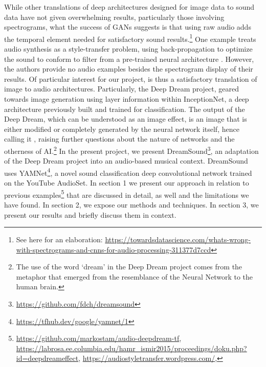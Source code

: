 \documentclass[a4paper,10pt,oneside]{article}
\begin{document}
\begin{sloppy}
While other translations of deep architectures designed for image data to sound data have not given overwhelming results, particularly those involving spectrograms, what the success of GANs suggests is that using raw audio adds the temporal element needed for satisfactory sound results.\footnote{See here for an elaboration: \url{https://towardsdatascience.com/whats-wrong-with-spectrograms-and-cnns-for-audio-processing-311377d7ccd}} One example treats audio synthesis as a style-transfer problem, using back-propagation to optimize the sound to conform to filter from a pre-trained neural architecture \cite{verma2018neural}. However, the authors provide no audio examples besides the spectrogram display of their results. Of particular interest for our project, is thus a satisfactory translation of image to audio architectures. Particularly, the Deep Dream project, geared towards image generation using layer information within InceptionNet, a deep architecture previously built and trained for classification. The output of the Deep Dream, which can be understood as an image effect, is an image that is either modified or completely generated by the neural network itself, hence calling it , raising further questions about the nature of networks and the otherness of AI.\footnote{The use of the word `dream' in the Deep Dream project comes from the metaphor that emerged from the resemblance of the Neural Network to the human brain.} In the present project, we present DreamSound\footnote{\url{https://github.com/fdch/dreamsound}}, an adaptation of the Deep Dream project into an audio-based musical context. DreamSound uses YAMNet\footnote{\url{https://tfhub.dev/google/yamnet/1}}, a novel sound classification deep convolutional network trained on the YouTube AudioSet. In section 1 we present our approach in relation to previous examples\footnote{
\url{https://github.com/markostam/audio-deepdream-tf}, 
\url{https://labrosa.ee.columbia.edu/hamr_ismir2015/proceedings/doku.php?id=deepdreameffect}, 
\url{https://audiostyletransfer.wordpress.com/}, 
} that are discussed in detail, as well and the limitations we have found. In section 2, we expose our methods and techniques. In section 3, we present our results and briefly discuss them in context.


\end{sloppy}
\end{document}
